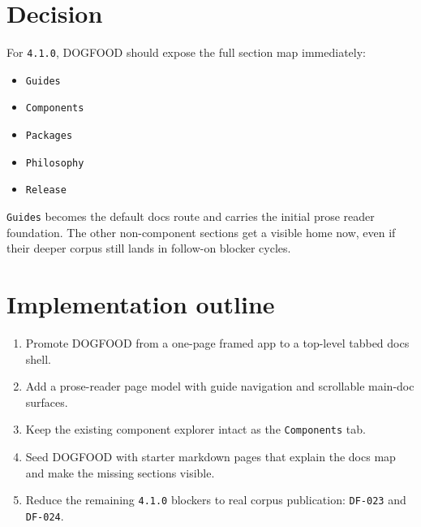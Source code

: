 \section{Decision}\label{record-083-decision}

For \texttt{4\allowbreak{}.\allowbreak{}1\allowbreak{}.\allowbreak{}0}, DOGFOOD should expose the full section map immediately:

\begin{itemize}
\tightlist
\item
  \texttt{G\allowbreak{}u\allowbreak{}i\allowbreak{}d\allowbreak{}e\allowbreak{}s}
\item
  \texttt{C\allowbreak{}o\allowbreak{}m\allowbreak{}p\allowbreak{}o\allowbreak{}n\allowbreak{}e\allowbreak{}n\allowbreak{}t\allowbreak{}s}
\item
  \texttt{P\allowbreak{}a\allowbreak{}c\allowbreak{}k\allowbreak{}a\allowbreak{}g\allowbreak{}e\allowbreak{}s}
\item
  \texttt{P\allowbreak{}h\allowbreak{}i\allowbreak{}l\allowbreak{}o\allowbreak{}s\allowbreak{}o\allowbreak{}p\allowbreak{}h\allowbreak{}y}
\item
  \texttt{R\allowbreak{}e\allowbreak{}l\allowbreak{}e\allowbreak{}a\allowbreak{}s\allowbreak{}e}
\end{itemize}

\texttt{G\allowbreak{}u\allowbreak{}i\allowbreak{}d\allowbreak{}e\allowbreak{}s} becomes the default docs route and carries the initial prose reader foundation. The other non-component sections get a visible home now, even if their deeper corpus still lands in follow-on blocker cycles.

\section{Implementation outline}\label{record-083-implementation-outline}

\begin{enumerate}
\def\labelenumi{\arabic{enumi}.}
\tightlist
\item
  Promote DOGFOOD from a one-page framed app to a top-level tabbed docs shell.
\item
  Add a prose-reader page model with guide navigation and scrollable main-doc surfaces.
\item
  Keep the existing component explorer intact as the \texttt{C\allowbreak{}o\allowbreak{}m\allowbreak{}p\allowbreak{}o\allowbreak{}n\allowbreak{}e\allowbreak{}n\allowbreak{}t\allowbreak{}s} tab.
\item
  Seed DOGFOOD with starter markdown pages that explain the docs map and make the missing sections visible.
\item
  Reduce the remaining \texttt{4\allowbreak{}.\allowbreak{}1\allowbreak{}.\allowbreak{}0} blockers to real corpus publication: \texttt{D\allowbreak{}F\allowbreak{}-\allowbreak{}0\allowbreak{}2\allowbreak{}3} and \texttt{D\allowbreak{}F\allowbreak{}-\allowbreak{}0\allowbreak{}2\allowbreak{}4}.
\end{enumerate}

